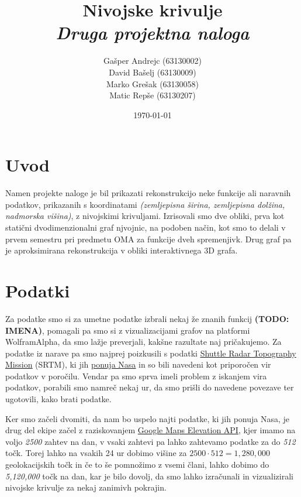\documentclass[a4paper,11pt]{article}
\title{\huge{Nivojske krivulje} \\ \Large{\em{Druga projektna naloga}}}
\author{
  Gašper Andrejc (63130002) \\
  David Bašelj (63130009) \\
  Marko Grešak (63130058) \\
  Matic Repše (63130207)
}
\date{\today}
\begin{document}
\maketitle

\section{Uvod}

Namen projekte naloge je bil prikazati rekonstrukcijo neke funkcije ali naravnih podatkov, prikazanih s koordinatami \textit{(zemljepisna širina, zemljepisna dolžina, nadmorska višina)}, z nivojskimi krivuljami. Izrisovali smo dve obliki, prva kot statični dvodimenzionalni graf njvojnic, na podoben način, kot smo to delali v prvem semestru pri predmetu OMA za funkcije dveh spremenjivk. Drug graf pa je aproksimirana rekonstrukcija v obliki interaktivnega 3D grafa.

\section{Podatki}

Za podatke smo si za umetne podatke izbrali nekaj že znanih funkcij \textbf{(TODO: IMENA)}, pomagali pa smo si z vizualizacijami grafov na platformi WolframAlpha, da smo lažje preverjali, kakšne razultate naj pričakujemo. Za podatke iz narave pa smo najprej poizkusili s podatki \href{http://en.wikipedia.org/wiki/Shuttle_Radar_Topography_Mission}{\underline{Shuttle Radar Topography Mission}} (SRTM), ki jih \href{http://dds.cr.usgs.gov/srtm/version2_1/SRTM3/}{\underline{ponuja Nasa}} in so bili navedeni kot priporočen vir podatkov v poročilu. Vendar pa smo sprva imeli problem z iskanjem vira podatkov, porabili smo namreč nekaj ur, da smo prišli do navedene povezave ter ugotovili, kako brati podatke.
\par
Ker smo začeli dvomiti, da nam bo uspelo najti podatke, ki jih ponuja Nasa, je drug del ekipe začel z raziskovanjem \href{https://developers.google.com/maps/documentation/elevation/}{\underline{Google Maps Elevation API}}, kjer imamo na voljo \textit{2500} zahtev na dan, v vsaki zahtevi pa lahko zahtevamo podatke za do \textit{512} točk. Torej lahko na vsakih 24 ur dobimo višine za \(2500 \cdot 512 = 1,280,000\) geolokacijskih točk in če to še pomnožimo z vsemi člani, lahko dobimo do \textit{5,120,000} točk na dan, kar je bilo dovolj, da smo lahko izračunali in vizualizirali nivojske krivulje za nekaj zanimivh pokrajin.
\end{document}

